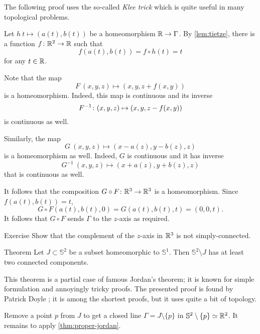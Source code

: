 The following proof uses the so-called \emph{Klee trick} which is quite useful in many topological problems.

Let $h\:t\mapsto (a(t),b(t))$ be a homeomorphism $\mathbb{R}\to \Gamma$.
By \ref{lem:tietze}, there is a function $f\:\RR^2\z\to\RR$ such that 
\[f(a(t),b(t))=f\circ h(t)=t\]
for any $t\in \mathbb{R}$.

Note that the map 
\[F\:(x,y,z)\mapsto (x,y,z+f(x,y))\] is a homeomorphism.
Indeed, this map is continuous and its inverse 
\[F^{-1}\:(x,y,z)\z\mapsto (x,y,z-f(x,y))\]
is continuous as well.

Similarly, the map 
\[G\:(x,y,z)\mapsto (x-a(z),y-b(z),z)\]
is a homeomorphism as well.
Indeed, $G$ is continuous and it has inverse 
\[G^{-1}\:(x,y,z)\mapsto (x+a(z),y+b(z),z)\]
that is continuous as well.

It follows that the composition $G\circ F\colon\mathbb{R}^3\to\mathbb{R}^3$ is a homeomorphism.
Since $f(a(t),b(t))=t$,
\[G\circ F(a(t),b(t),0)=G(a(t),b(t),t)=(0,0,t).\]
It follows that $G\circ F$ sends $\Gamma$ to the $z$-axis as required.
\qeds

\begin{thm}{Exercise}\label{ex:z-axis}
Show that the complement of the $z$-axis in $\mathbb{R}^3$ is not simply-connected.
\end{thm}

\begin{thm}{Theorem}
Let $J\subset\mathbb{S}^2$ be a subset homeomorphic to $\mathbb{S}^1$.
Then $\mathbb{S}^2\setminus J$ has at least two connected components. 
\end{thm}

This theorem is a partial case of famous Jordan's theorem;
it is known for simple formulation and annoyingly tricky proofs.
The presented proof is found by Patrick Doyle \cite{doyle}; 
it is among the shortest proofs, but it uses quite a bit of topology.

Remove a point $p$ from $J$ to get a closed line $\Gamma=J\setminus\{p\}$ in $ \mathbb{S}^2\setminus\{p\}\simeq\mathbb{R}^2$.
It remains to apply \ref{thm:proper-jordan}.
\qeds

